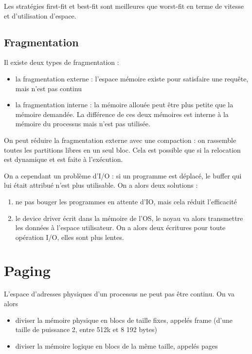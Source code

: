 	Les stratégies first-fit et best-fit sont meilleures que worst-fit en terme de vitesse et d'utilisation d'espace.
	
	\subsection{Fragmentation}
	
	Il existe deux types de fragmentation :
	
	\begin{itemize}
		\item la fragmentation externe : l'espace mémoire existe pour satisfaire une requête, mais n'est pas continu
		\item la fragmentation interne : la mémoire allouée peut être plus petite que la mémoire demandée. La différence de ces deux mémoires est interne à la mémoire du processus mais n'est pas utilisée.
	\end{itemize}
	
	On peut réduire la fragmentation externe avec une compaction : on rassemble toutes les partitions libres en un seul bloc. Cela est possible que si la relocation est dynamique et est faite à l'exécution.
	
	
	On a cependant un problème d'I/O : si un programme est déplacé, le buffer qui lui était attribué n'est plus utilisable. On a alors deux solutions :
	
	\begin{enumerate}
		\item ne pas bouger les programmes en attente d'IO, mais cela réduit l'efficacité
		\item le device driver écrit dans la mémoire de l'OS, le noyau va alors transmettre les données à l'espace utilisateur. On a alors deux écritures pour toute opération I/O, elles sont plus lentes.
	\end{enumerate}
	
\section{Paging}

L'espace d'adresses physiques d'un processus ne peut pas être continu. On va alors 

\begin{itemize}
	\item diviser la mémoire physique en blocs de taille fixes, appelés frame (d'une taille de puissance 2, entre 512k et 8 192 bytes)
	\item diviser la mémoire logique en blocs de la même taille, appelés pages
\end{itemize}

